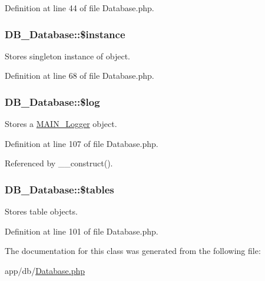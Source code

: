 Definition at line 44 of file Database.php.\hypertarget{classDB__Database_a05ffbe581936d85f566ded58d8841b5b}{
\subsubsection[{\$instance}]{\setlength{\rightskip}{0pt plus 5cm}DB\_\-Database::\$instance}}
\label{d3/d63/classDB__Database_a05ffbe581936d85f566ded58d8841b5b}
Stores singleton instance of object. 

Definition at line 68 of file Database.php.\hypertarget{classDB__Database_a707cb0823a2ad42054c4ab650b2dd01b}{
\subsubsection[{\$log}]{\setlength{\rightskip}{0pt plus 5cm}DB\_\-Database::\$log}}
\label{d3/d63/classDB__Database_a707cb0823a2ad42054c4ab650b2dd01b}
Stores a \hyperlink{classMAIN__Logger}{MAIN\_\-Logger} object. 

Definition at line 107 of file Database.php.

Referenced by \_\-\_\-construct().\hypertarget{classDB__Database_a96d1439bc2c2a8edfaf03b593898b3f2}{
\subsubsection[{\$tables}]{\setlength{\rightskip}{0pt plus 5cm}DB\_\-Database::\$tables}}
\label{d3/d63/classDB__Database_a96d1439bc2c2a8edfaf03b593898b3f2}
Stores table objects. 

Definition at line 101 of file Database.php.

The documentation for this class was generated from the following file:\begin{DoxyCompactItemize}
\item 
app/db/\hyperlink{Database_8php}{Database.php}\end{DoxyCompactItemize}
